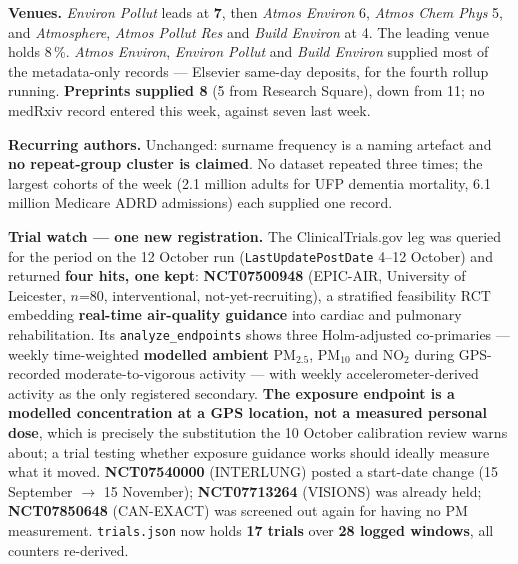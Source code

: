 \documentclass[10pt]{article}
\begin{document}
\footnotesize
\textbf{Venues.} \textit{Environ Pollut} leads at \textbf{7}, then \textit{Atmos Environ} 6,
\textit{Atmos Chem Phys} 5, and \textit{Atmosphere}, \textit{Atmos Pollut Res} and \textit{Build
Environ} at 4. The leading venue holds 8\,\%. \textit{Atmos Environ}, \textit{Environ Pollut} and
\textit{Build Environ} supplied most of the metadata-only records --- Elsevier same-day deposits, for the
fourth rollup running. \textbf{Preprints supplied 8} (5 from Research Square), down from 11; no medRxiv
record entered this week, against seven last week.

\vspace{1.5mm}
\textbf{Recurring authors.} Unchanged: surname frequency is a naming artefact and \textbf{no repeat-group
cluster is claimed}. No dataset repeated three times; the largest cohorts of the week
(2.1 million adults for UFP dementia mortality, 6.1 million Medicare ADRD admissions) each supplied one
record.

\vspace{1.5mm}
\textbf{Trial watch --- one new registration.} The ClinicalTrials.gov leg was queried for the period on
the 12 October run (\texttt{LastUpdatePostDate} 4--12 October) and returned \textbf{four hits, one
kept}: \textbf{NCT07500948} (EPIC-AIR, University of Leicester, $n$=80, interventional,
not-yet-recruiting), a stratified feasibility RCT embedding \textbf{real-time air-quality guidance} into
cardiac and pulmonary rehabilitation. Its \texttt{analyze\_endpoints} shows three Holm-adjusted
co-primaries --- weekly time-weighted \textbf{modelled ambient} PM$_{2.5}$, PM$_{10}$ and NO$_2$ during
GPS-recorded moderate-to-vigorous activity --- with weekly accelerometer-derived activity as the only
registered secondary. \textbf{The exposure endpoint is a modelled concentration at a GPS location, not a
measured personal dose}, which is precisely the substitution the 10 October calibration review warns
about; a trial testing whether exposure guidance works should ideally measure what it moved.
\textbf{NCT07540000} (INTERLUNG) posted a start-date change (15 September $\rightarrow$ 15 November);
\textbf{NCT07713264} (VISIONS) was already held; \textbf{NCT07850648} (CAN-EXACT) was screened out again
for having no PM measurement. \texttt{trials.json} now holds \textbf{17 trials} over \textbf{28 logged
windows}, all counters re-derived.
\end{document}
